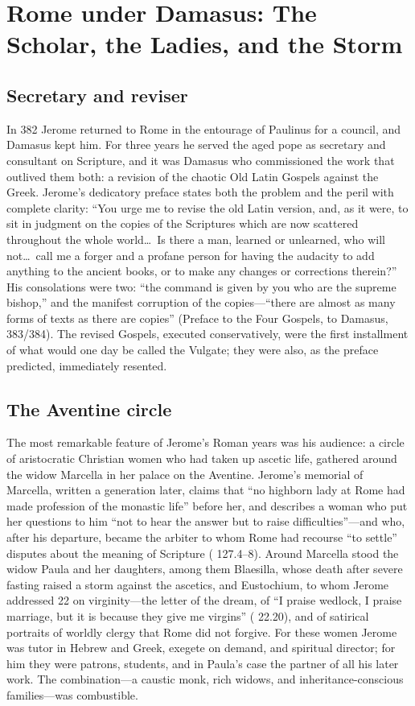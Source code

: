 \section{Rome under Damasus: The Scholar, the Ladies, and the Storm}

\subsection{Secretary and reviser}

In 382 Jerome returned to Rome in the entourage of Paulinus for a council, and
Damasus kept him. For three years he served the aged pope as secretary and
consultant on Scripture, and it was Damasus who commissioned the work that
outlived them both: a revision of the chaotic Old Latin Gospels against the
Greek. Jerome's dedicatory preface states both the problem and the peril with
complete clarity: ``You urge me to revise the old Latin version, and, as it
were, to sit in judgment on the copies of the Scriptures which are now
scattered throughout the whole world\ldots\ Is there a man, learned or
unlearned, who will not\ldots\ call me a forger and a profane person for
having the audacity to add anything to the ancient books, or to make any
changes or corrections therein?'' His consolations were two: ``the command is
given by you who are the supreme bishop,'' and the manifest corruption of the
copies---``there are almost as many forms of texts as there are copies''
(Preface to the Four Gospels, to Damasus, 383/384). The revised Gospels,
executed conservatively, were the first installment of what would one day be
called the Vulgate; they were also, as the preface predicted, immediately
resented.

\subsection{The Aventine circle}

The most remarkable feature of Jerome's Roman years was his audience: a circle
of aristocratic Christian women who had taken up ascetic life, gathered around
the widow Marcella in her palace on the Aventine. Jerome's memorial of
Marcella, written a generation later, claims that ``no highborn lady at Rome
had made profession of the monastic life'' before her, and describes a woman
who put her questions to him ``not to hear the answer but to raise
difficulties''---and who, after his departure, became the arbiter to whom
Rome had recourse ``to settle'' disputes about the meaning of Scripture
( 127.4--8). Around Marcella stood the widow Paula and her
daughters, among them Blaesilla, whose death after severe fasting raised a
storm against the ascetics, and Eustochium, to whom Jerome addressed
 22 on virginity---the letter of the dream, of ``I praise
wedlock, I praise marriage, but it is because they give me virgins''
( 22.20), and of satirical portraits of worldly clergy that Rome
did not forgive. For these women Jerome was tutor in Hebrew and Greek,
exegete on demand, and spiritual director; for him they were patrons,
students, and in Paula's case the partner of all his later work. The
combination---a caustic monk, rich widows, and inheritance-conscious
families---was combustible.

